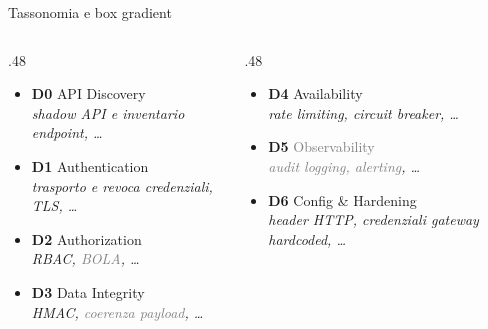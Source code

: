 
\begin{frame}{Tassonomia e box gradient}
      \begin{columns}
            \begin{column}{.48\textwidth}
                  \begin{itemize}
                        \item \textbf{D0} \alert{API Discovery}\\
                              {\scriptsize\itshape shadow API e inventario endpoint,  \dots}

                        \item \textbf{D1} \alert{Authentication}\\
                              {\scriptsize\itshape trasporto e revoca credenziali, TLS, \dots}

                        \item \textbf{D2} \alert{Authorization}\\
                              {\scriptsize\itshape RBAC, \textcolor{gray}{BOLA}, \dots}

                        \item \textbf{D3} \alert{Data Integrity}\\
                              {\scriptsize\itshape HMAC, \textcolor{gray}{coerenza payload}, \dots}
                  \end{itemize}
            \end{column}

            \begin{column}{.48\textwidth}
                  \begin{itemize}
                        \item \textbf{D4} \alert{Availability}\\
                              {\scriptsize\itshape rate limiting, circuit breaker, \dots}

                        \item \textbf{D5} \textcolor{gray}{Observability}\\
                              {\scriptsize\itshape\textcolor{gray}{audit logging, alerting}, \dots}

                        \item \textbf{D6} \alert{Config \& Hardening}\\
                              {\scriptsize\itshape header HTTP, credenziali gateway hardcoded, \dots}


\end{itemize}
\end{column}
\end{columns}
\end{frame}
